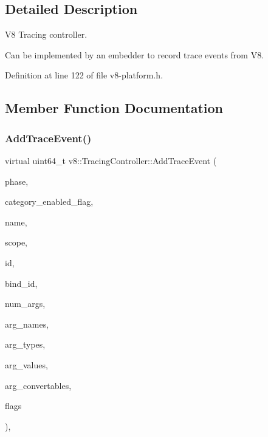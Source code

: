 \subsection{Detailed Description}
V8 Tracing controller.

Can be implemented by an embedder to record trace events from V8. 

Definition at line 122 of file v8-\/platform.\+h.



\subsection{Member Function Documentation}
\mbox{\label{classv8_1_1TracingController_ad1e234b340ea8f9f1e3386aa21dad5dd}} 
\subsubsection{\texorpdfstring{Add\+Trace\+Event()}{AddTraceEvent()}}
{\footnotesize\ttfamily virtual uint64\+\_\+t v8\+::\+Tracing\+Controller\+::\+Add\+Trace\+Event (\begin{DoxyParamCaption}\item[{char}]{phase,  }\item[{const uint8\+\_\+t $\ast$}]{category\+\_\+enabled\+\_\+flag,  }\item[{const char $\ast$}]{name,  }\item[{const char $\ast$}]{scope,  }\item[{uint64\+\_\+t}]{id,  }\item[{uint64\+\_\+t}]{bind\+\_\+id,  }\item[{int32\+\_\+t}]{num\+\_\+args,  }\item[{const char $\ast$$\ast$}]{arg\+\_\+names,  }\item[{const uint8\+\_\+t $\ast$}]{arg\+\_\+types,  }\item[{const uint64\+\_\+t $\ast$}]{arg\+\_\+values,  }\item[{std\+::unique\+\_\+ptr$<$ \mbox{\hyperlink{classv8_1_1ConvertableToTraceFormat}{Convertable\+To\+Trace\+Format}} $>$ $\ast$}]{arg\+\_\+convertables,  }\item[{unsigned int}]{flags }\end{DoxyParamCaption})\hspace{0.3cm}{\ttfamily [inline]}, {\ttfamily [virtual]}}

